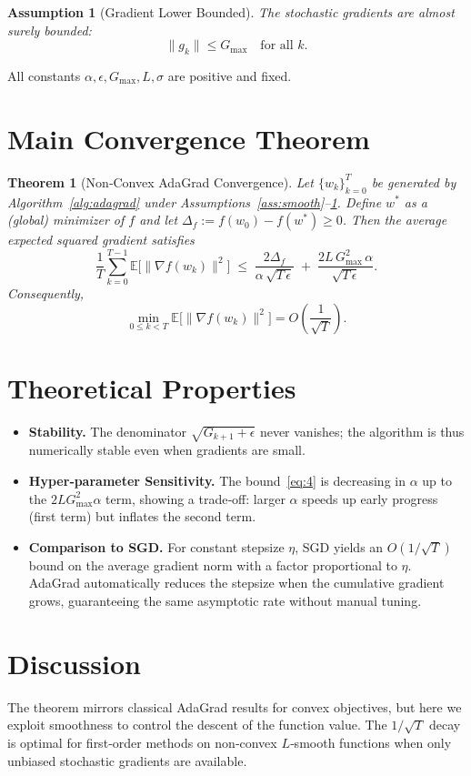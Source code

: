 \documentclass{article}
\newtheorem{theorem}{Theorem}
\newtheorem{assumption}{Assumption}
\newcommand{\E}{\mathbb{E}}
\begin{document}
\begin{assumption}[Gradient Lower Bounded]\label{ass:gradbound}
The stochastic gradients are almost surely bounded:
\[
\|g_k\|\le G_{\max}\quad\text{for all }k .
\]
\end{assumption}

All constants $\alpha,\epsilon,G_{\max},L,\sigma$ are positive and fixed.

\section*{Main Convergence Theorem}
\begin{theorem}[Non‑Convex AdaGrad Convergence]\label{thm:main}
Let $\{w_k\}_{k=0}^{T}$ be generated by Algorithm~\ref{alg:adagrad}
under Assumptions~\ref{ass:smooth}–\ref{ass:gradbound}.
Define $w^{*}$ as a (global) minimizer of $f$ and let
$\Delta_f:=f(w_0)-f(w^{*})\ge0$.
Then the average expected squared gradient satisfies
\[
\frac{1}{T}\sum_{k=0}^{T-1}\E\!\big[\|\nabla f(w_k)\|^{2}\big]
\;\le\;
\frac{2\Delta_f}{\alpha\,\sqrt{T\,\epsilon}}
\;+\;
\frac{2L\,G_{\max}^{2}\,\alpha}{\sqrt{T\,\epsilon}} .
\tag{4}
\]
Consequently,
\[
\min_{0\le k<T}\E\!\big[\|\nabla f(w_k)\|^{2}\big]
= O\!\left(\frac{1}{\sqrt{T}}\right).
\]
\end{theorem}

\section*{Theoretical Properties}
\begin{itemize}
\item \textbf{Stability.} The denominator $\sqrt{G_{k+1}+\epsilon}$ never
vanishes; the algorithm is thus numerically stable even when gradients are
small.
\item \textbf{Hyper‑parameter Sensitivity.}
  The bound~\eqref{eq:4} is decreasing in $\alpha$ up to the
  $2L G_{\max}^{2}\alpha$ term, showing a trade‑off:
  larger $\alpha$ speeds up early progress (first term) but inflates the second term.
\item \textbf{Comparison to SGD.}
  For constant stepsize $\eta$, SGD yields an $O(1/\sqrt{T})$ bound on the
  average gradient norm with a factor proportional to $\eta$. AdaGrad automatically
  reduces the stepsize when the cumulative gradient grows,
  guaranteeing the same asymptotic rate without manual tuning.
\end{itemize}

\section*{Discussion}
The theorem mirrors classical AdaGrad results for convex objectives,
but here we exploit smoothness to control the descent of the function value.
The $1/\sqrt{T}$ decay is optimal for first‑order methods on non‑convex
$L$‑smooth functions when only unbiased stochastic gradients are available.
\end{document}
